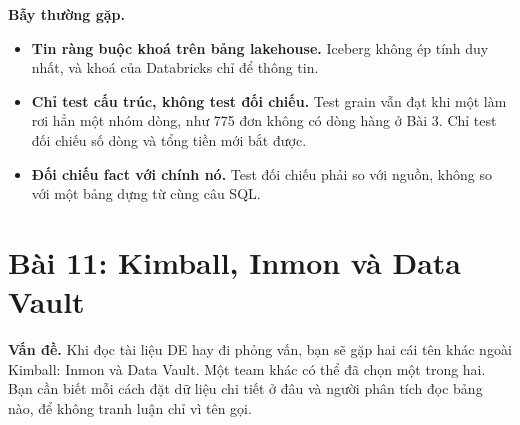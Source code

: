 \begin{luuy}
\textbf{Bẫy thường gặp.}
\begin{itemize}
  \item \textbf{Tin ràng buộc khoá trên bảng lakehouse.} Iceberg không ép tính duy nhất, và khoá của Databricks chỉ để thông tin.
  \item \textbf{Chỉ test cấu trúc, không test đối chiếu.} Test grain vẫn đạt khi một  làm rơi hẳn một nhóm dòng, như 775 đơn không có dòng hàng ở Bài 3. Chỉ test đối chiếu số dòng và tổng tiền mới bắt được.
  \item \textbf{Đối chiếu fact với chính nó.} Test đối chiếu phải so với nguồn, không so với một bảng dựng từ cùng câu SQL.
\end{itemize}
\end{luuy}

\section{Bài 11: Kimball, Inmon và Data Vault}

\textbf{Vấn đề.} Khi đọc tài liệu DE hay đi phỏng vấn, bạn sẽ gặp hai cái tên khác ngoài Kimball: Inmon và Data Vault. Một team khác có thể đã chọn một trong hai. Bạn cần biết mỗi cách đặt dữ liệu chi tiết ở đâu và người phân tích đọc bảng nào, để không tranh luận chỉ vì tên gọi.

